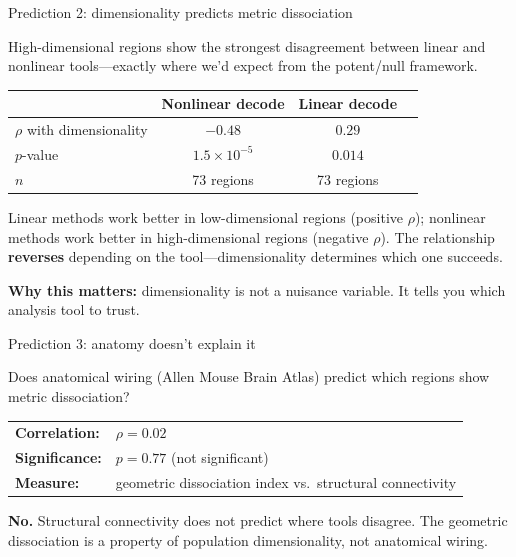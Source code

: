 \documentclass[aspectratio=169,11pt]{beamer}
\begin{document}
\begin{frame}{Prediction 2: dimensionality predicts metric dissociation}

High-dimensional regions show the strongest disagreement between linear and nonlinear tools---exactly where we'd expect from the potent/null framework.

\vspace{0.4em}

\begin{center}
{\small
\begin{tabular}{lccc}
\toprule
& \textbf{Nonlinear decode} & \textbf{Linear decode} \\
\midrule
$\rho$ with dimensionality & $-0.48$ & $0.29$ \\
$p$-value & $1.5 \times 10^{-5}$ & $0.014$ \\
$n$ & 73 regions & 73 regions \\
\bottomrule
\end{tabular}
}
\end{center}

\vspace{0.4em}

Linear methods work better in low-dimensional regions (positive $\rho$); nonlinear methods work better in high-dimensional regions (negative $\rho$). The relationship \textbf{reverses} depending on the tool---dimensionality determines which one succeeds.

\vspace{0.4em}
{\small \textbf{Why this matters:} dimensionality is not a nuisance variable. It tells you which analysis tool to trust.}
\end{frame}

\begin{frame}{Prediction 3: anatomy doesn't explain it}

Does anatomical wiring (Allen Mouse Brain Atlas) predict which regions show metric dissociation?

\vspace{1em}

\begin{center}
\begin{tabular}{ll}
\textbf{Correlation:} & $\rho = 0.02$ \\[0.3em]
\textbf{Significance:} & $p = 0.77$ (not significant) \\[0.3em]
\textbf{Measure:} & geometric dissociation index vs.\ structural connectivity \\
\end{tabular}
\end{center}

\vspace{1em}

\textbf{No.} Structural connectivity does not predict where tools disagree. The geometric dissociation is a property of population dimensionality, not anatomical wiring.

\end{frame}
\end{document}
